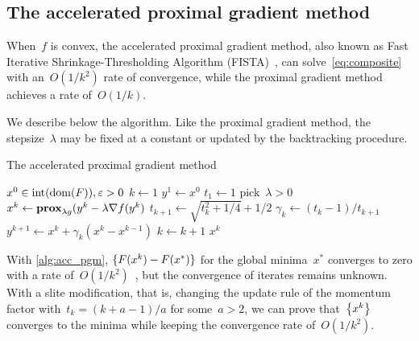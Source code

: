 \documentclass[../../main]{subfiles}
\begin{document}
\subsection{The accelerated proximal gradient method} \label{sec:intro:composite:acc_pgm}
When~$f$ is convex, the accelerated proximal gradient method, also known as Fast Iterative Shrinkage-Thresholding Algorithm (FISTA)~\cite{Beck2009}, can solve~\cref{eq:composite} with an~$O(1 / k^2)$ rate of convergence, while the proximal gradient method achieves a rate of~$O(1 / k)$.

We describe below the algorithm.
Like the proximal gradient method, the stepsize~$\lambda$ may be fixed at a constant or updated by the backtracking procedure.
\begin{algorithm}[hbtp]
    \caption{The accelerated proximal gradient method}
    \label{alg:acc_pgm}
    \begin{algorithmic}[1]
        \Require $x^0 \in \interior (\dom (F)), \varepsilon > 0$
        \State $k \gets 1$
        \State $y^1 \gets x^0$
        \State $t_1 \gets 1$
        \Repeat
        \State pick~$\lambda > 0$
        \State $x^k \gets \prox_{\lambda g}(y^k - \lambda \nabla f(y^k)$
        \State $t_{k + 1} \gets \sqrt{t_k^2 + 1 / 4} + 1 / 2$
        \State $\gamma_k \gets (t_k - 1) / t_{k + 1}$
        \State $y^{k + 1} \gets x^k + \gamma_k (x^k - x^{k - 1})$
        \State $k \gets k + 1$
        \State \Return $x^k$
    \end{algorithmic}
\end{algorithm}

With \cref{alg:acc_pgm}, $\set{F(x^k) - F(x^\ast)}$ for the global minima~$x^\ast$ converges to zero with a rate of~$O(1 / k^2)$~\cite{Beck2009}, but the convergence of iterates remains unknown.
With a slite modification, that is, changing the update rule of the momentum factor with~$t_k = (k + a - 1) / a$ for some~$a > 2$, we can prove that~$\set*{x^k}$ converges to the minima while keeping the convergence rate of~$O(1 / k^2)$.
\end{document}
